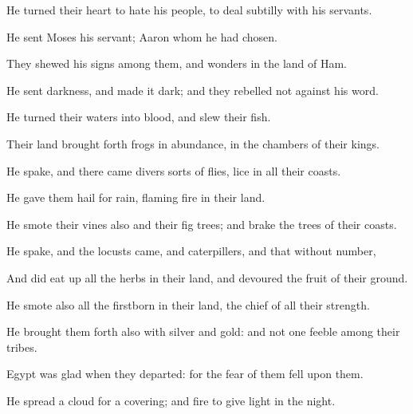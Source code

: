 {\Q {}He
turned their
heart to
hate his
people, to deal
subtilly with his
servants.


\par }{\Q {}He
sent
Moses his
servant;
{}
Aaron whom he had
chosen.


\par }{\Q {}They
shewed his
signs among them, and
wonders in the
land of
Ham.


\par }{\Q {}He
sent
darkness, and made it
dark; and they
rebelled not against his
word.


\par }{\Q {}He
turned their
waters into
blood, and
slew their
fish.


\par }{\Q {}Their
land brought
forth
frogs in
abundance, in the
chambers of their
kings.


\par }{\Q {}He
spake, and there
came divers sorts of
flies,
{}
lice in all their
coasts.


\par }{\Q {}He
gave them
hail for
rain,
{}
flaming
fire in their
land.


\par }{\Q {}He
smote their
vines also and their fig
trees; and
brake the
trees of their
coasts.


\par }{\Q {}He
spake, and the
locusts
came, and
caterpillers, and that without
number,


\par }{\Q {}And did eat
up all the
herbs in their
land, and
devoured the
fruit of their
ground.


\par }{\Q {}He
smote also all the
firstborn in their
land, the
chief of all their
strength.


\par }{\Q {}He brought them
forth also with
silver and
gold: and
{} not one
feeble
{} among their
tribes.


\par }{\Q {}Egypt was
glad when they
departed: for the
fear of them
fell upon them.


\par }{\Q {}He
spread a
cloud for a
covering; and
fire to give
light in the
night.


}
